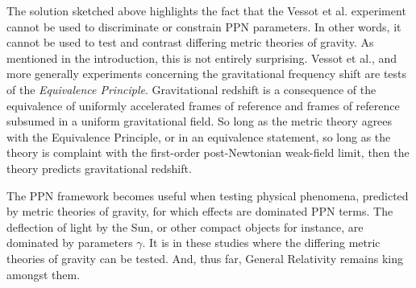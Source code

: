 \documentclass[11pt]{article}
\begin{document}
The solution sketched above highlights the fact that the Vessot et al. experiment cannot be used to discriminate or constrain PPN parameters. In other words, it cannot be used to test and contrast differing metric theories of gravity. As mentioned in the introduction, this is not entirely surprising. Vessot et al., and more generally experiments concerning the gravitational frequency shift are tests of the \textit{Equivalence Principle}. Gravitational redshift is a consequence of the equivalence of uniformly accelerated frames of reference and frames of reference subsumed in a uniform gravitational field. So long as the metric theory agrees with the Equivalence Principle, or in an equivalence statement, so long as the theory is complaint with the first-order post-Newtonian weak-field limit, then the theory predicts gravitational redshift.

The PPN framework becomes useful when testing physical phenomena, predicted by metric theories of gravity, for which effects are dominated PPN terms. The deflection of light by the Sun, or other compact objects for instance, are dominated by parameters $\gamma$. It is in these studies where the differing metric theories of gravity can be tested. And, thus far, General Relativity remains king amongst them.
\end{document}

